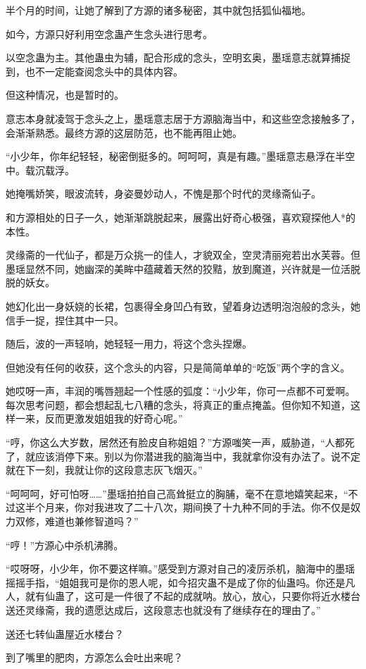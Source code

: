 \begin{this_body}
半个月的时间，让她了解到了方源的诸多秘密，其中就包括狐仙福地。

如今，方源只好利用空念蛊产生念头进行思考。

以空念蛊为主。其他蛊虫为辅，配合形成的念头，空明玄奥，墨瑶意志就算捕捉到，也不一定能查阅念头中的具体内容。

但这种情况，也是暂时的。

意志本身就凌驾于念头之上，墨瑶意志居于方源脑海当中，和这些空念接触多了，会渐渐熟悉。最终方源的这层防范，也不能再阻止她。

“小少年，你年纪轻轻，秘密倒挺多的。呵呵呵，真是有趣。”墨瑶意志悬浮在半空中。载沉载浮。

她掩嘴娇笑，眼波流转，身姿曼妙动人，不愧是那个时代的灵缘斋仙子。

和方源相处的日子一久，她渐渐跳脱起来，展露出好奇心极强，喜欢窥探他人*的本性。

灵缘斋的一代仙子，都是万众挑一的佳人，才貌双全，空灵清丽宛若出水芙蓉。但墨瑶显然不同，她幽深的美眸中蕴藏着天然的狡黠，放到魔道，兴许就是一位活脱脱的妖女。

她幻化出一身妖娆的长裙，包裹得全身凹凸有致，望着身边透明泡泡般的念头，她信手一捉，捏住其中一只。

随后，波的一声轻响，她轻轻一用力，将这个念头捏爆。

但她没有任何的收获，这个念头的内容，只是简简单单的“吃饭”两个字的含义。

她哎呀一声，丰润的嘴唇翘起一个性感的弧度：“小少年，你可一点都不可爱啊。每次思考问题，都会想起乱七八糟的念头，将真正的重点掩盖。但你知不知道，这样一来，反而更激发姐姐我的好奇心呢。”

“哼，你这么大岁数，居然还有脸皮自称姐姐？”方源嗤笑一声，威胁道，“人都死了，就应该消停下来。别以为你潜进我的脑海当中，我就拿你没有办法了。说不定就在下一刻，我就让你的这段意志灰飞烟灭。”

“呵呵呵，好可怕呀……”墨瑶拍拍自己高耸挺立的胸脯，毫不在意地嬉笑起来，“不过这半个月来，你对我进攻了二十八次，期间换了十九种不同的手法。你不仅是奴力双修，难道也兼修智道吗？”

“哼！”方源心中杀机沸腾。

“哎呀呀，小少年，你不要这样嘛。”感受到方源对自己的凌厉杀机，脑海中的墨瑶摇摇手指，“姐姐我可是你的恩人呢，如今招灾蛊不是成了你的仙蛊吗。你还是凡人，就有仙蛊了，这可是一件很了不起的成就呐。放心，放心，只要你将近水楼台送还灵缘斋，我的遗愿达成后，这段意志也就没有了继续存在的理由了。”

送还七转仙蛊屋近水楼台？

到了嘴里的肥肉，方源怎么会吐出来呢？


\end{this_body}
